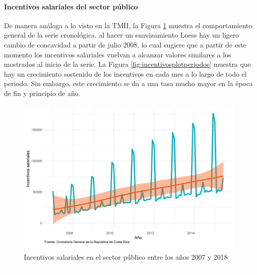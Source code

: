 \documentclass[
]{article}
\begin{document}
\paragraph{Incentivos salariales del sector público}

De manera análoga a lo visto en la TMII, la Figura
\ref{fig:incentivosplotgeneral} muestra el comportamiento general de la
serie cronológica. al hacer un suavizamiento Loess hay un ligero cambio
de concavidad a partir de julio 2008, lo cual sugiere que a partir de
este momento los incentivos salariales vuelvan a alcanzar valores
similares a los mostrados al inicio de la serie. La Figura
\ref{fig:incentivosplotperiodos} muestra que hay un crecimiento
sostenido de los incentivos en cada mes a lo largo de todo el periodo.
Sin embargo, este crecimiento se da a una tasa mucho mayor en la época
de fin y principio de año.

\begin{figure}[H]
\includegraphics[width=1\linewidth,height=1\textheight]{Tesis_files/figure-latex/incentivosplotgeneral-1} \caption{Incentivos salariales en el sector público entre los años 2007 y 2018 \textcolor{white}{prueba de aaaaaaaaaaaaaaaaaaaaaaa}}\label{fig:incentivosplotgeneral}
\end{figure}
\end{document}
